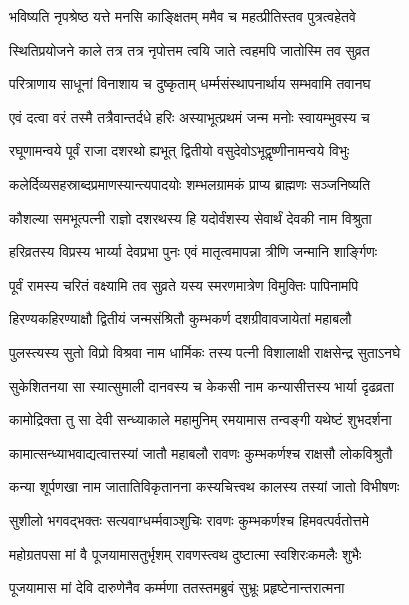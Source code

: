 
\twolineshloka
{भविष्यति नृपश्रेष्ठ यत्ते मनसि काङ्क्षितम्}
{ममैव च महत्प्रीतिस्तव पुत्रत्वहेतवे}%

\twolineshloka
{स्थितिप्रयोजने काले तत्र तत्र नृपोत्तम}
{त्वयि जाते त्वहमपि जातोस्मि तव सुव्रत}%

\twolineshloka
{परित्राणाय साधूनां विनाशाय च दुष्कृताम्}
{धर्म्मसंस्थापनार्थाय सम्भवामि तवानघ}%


\twolineshloka
{एवं दत्वा वरं तस्मै तत्रैवान्तर्दधे हरिः}
{अस्याभूत्प्रथमं जन्म मनोः स्वायम्भुवस्य च}%

\twolineshloka
{रघूणामन्वये पूर्वं राजा दशरथो ह्यभूत्}
{द्वितीयो वसुदेवोऽभूद्वृष्णीनामन्वये विभुः}%

\twolineshloka
{कलेर्दिव्यसहस्राब्दप्रमाणस्यान्त्यपादयोः}
{शम्भलग्रामकं प्राप्य ब्राह्मणः सञ्जनिष्यति}%

\twolineshloka
{कौशल्या समभूत्पत्नी राज्ञो दशरथस्य हि}
{यदोर्वंशस्य सेवार्थं देवकी नाम विश्रुता}%

\twolineshloka
{हरिव्रतस्य विप्रस्य भार्य्या देवप्रभा पुनः}
{एवं मातृत्वमापन्ना त्रीणि जन्मानि शार्ङ्गिणः}%

\twolineshloka
{पूर्वं रामस्य चरितं वक्ष्यामि तव सुव्रते}
{यस्य स्मरणमात्रेण विमुक्तिः पापिनामपि}%

\twolineshloka
{हिरण्यकहिरण्याक्षौ द्वितीयं जन्मसंश्रितौ}
{कुम्भकर्ण दशग्रीवावजायेतां महाबलौ}%

\twolineshloka
{पुलस्त्यस्य सुतो विप्रो विश्रवा नाम धार्मिकः}
{तस्य पत्नी विशालाक्षी राक्षसेन्द्र सुताऽनघे}%

\twolineshloka
{सुकेशितनया सा स्यात्सुमाली दानवस्य च}
{केकसी नाम कन्यासीत्तस्य भार्या दृढव्रता}%

\twolineshloka
{कामोद्रिक्ता तु सा देवी सन्ध्याकाले महामुनिम्}
{रमयामास तन्वङ्गी यथेष्टं शुभदर्शना}%

\twolineshloka
{कामात्सन्ध्याभवाद्यत्वात्तस्यां जातौ महाबलौ}
{रावणः कुम्भकर्णश्च राक्षसौ लोकविश्रुतौ}%

\twolineshloka
{कन्या शूर्पणखा नाम जातातिविकृतानना}
{कस्यचित्त्वथ कालस्य तस्यां जातो विभीषणः}%

\twolineshloka
{सुशीलो भगवद्भक्तः सत्यवाग्धर्म्मवाञ्शुचिः}
{रावणः कुम्भकर्णश्च हिमवत्पर्वतोत्तमे}%

\twolineshloka
{महोग्रतपसा मां वै पूजयामासतुर्भृशम्}
{रावणस्त्वथ दुष्टात्मा स्वशिरःकमलैः शुभैः}%

\twolineshloka
{पूजयामास मां देवि दारुणेनैव कर्म्मणा}
{ततस्तमब्रुवं सुभ्रूः प्रहृष्टेनान्तरात्मना}%

